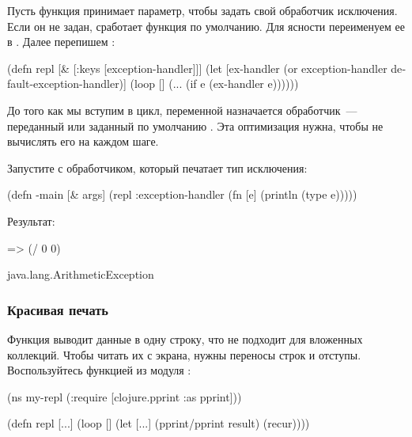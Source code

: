 Пусть функция  принимает параметр, чтобы задать свой обработчик исключения. Если он не задан, сработает функция по умолчанию. Для ясности переименуем ее в . Далее перепишем :

\begin{english}
  \begin{clojure/lines}
(defn repl
  [& [{:keys [exception-handler]}]]
  (let [ex-handler
        (or exception-handler
            default-exception-handler)]
    (loop []
      (...
        (if e
          (ex-handler e))))))
  \end{clojure/lines}
\end{english}

\pagebreaklarge

До того как мы вступим в цикл, переменной  назначается обработчик~--- переданный или заданный по умолчанию . Эта оптимизация нужна, чтобы не вычислять его на каждом шаге.

Запустите  с обработчиком, который печатает тип исключения:

\begin{english}
  \begin{clojure}
(defn -main
  [& args]
  (repl
    {:exception-handler
      (fn [e]
        (println (type e)))}))
  \end{clojure}
\end{english}

Результат:

\begin{english}
  \begin{clojure}
=> (/ 0 0)

java.lang.ArithmeticException
  \end{clojure}
\end{english}

\subsubsection{Красивая печать}


Функция  выводит данные в одну строку, что не подходит для вложенных коллекций. Чтобы читать их с экрана, нужны переносы строк и отступы. Воспользуйтесь функцией  из модуля :

\begin{english}
  \begin{clojure}
(ns my-repl
  (:require
   [clojure.pprint :as pprint]))

(defn repl
  [...]
  (loop []
    (let [...]
      (pprint/pprint result)
      (recur))))
  \end{clojure}
\end{english}

